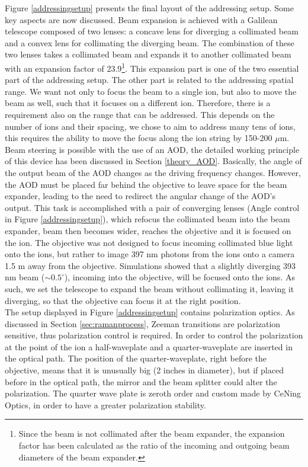 Figure \ref{addressingsetup} presents the final layout of the addressing setup. Some key aspects are now discussed. Beam expansion is achieved with a Galilean telescope composed of two lenses: a concave lens for diverging a collimated beam and a convex lens for collimating the diverging beam. The combination of these two lenses takes a collimated beam and expands it to another collimated beam with an expansion factor of 23.9\footnote{Since the beam is not collimated after the beam expander, the expansion factor has been calculated as the ratio of the incoming and outgoing beam diameters of the beam expander.}. This expansion part is one of the two essential part of the addressing setup. The other part is related to the addressing spatial range. We want not only to focus the beam to a single ion, but also to move the beam as well, such that it focuses on a different ion. Therefore, there is a requirement also on the range that can be addressed. This depends on the number of ions and their spacing, we chose to aim to address many tens of ions, this requires the ability to move the focus along the ion string by 150-200 $\mu$m. Beam steering is possible with the use of an AOD, the detailed working principle of this device has been discussed in Section \ref{theory_AOD}. Basically, the angle of the output beam of the AOD changes as the driving frequency changes. However, the AOD must be placed far behind the objective to leave space for the beam expander, leading to the need to redirect the angular change of the AOD's output. This task is accomplished with a pair of converging lenses (Angle control in Figure \ref{addressingsetup}), which refocus the collimated beam into the beam expander, beam then becomes wider, reaches the objective and it is focused on the ion. The objective was not designed to focus incoming collimated blue light onto the ions, but rather to image 397 nm photons from the ions onto a camera 1.5 m away from the objective. Simulations showed that a slightly diverging 393 nm beam ($\sim 0.5^\circ$), incoming into the objective, will be focused onto the ions. As such, we set the telescope to expand the beam without collimating it, leaving it diverging, so that the objective can focus it at the right position.\\
The setup displayed in Figure \ref{addressingsetup} contains polarization optics. As discussed in Section \ref{sec:ramanprocess}, Zeeman transitions are polarization sensitive, thus polarization control is required. In order to control the polarization at the point of the ion a half-waveplate and a quarter-waveplate are inserted in the optical path. The position of the quarter-waveplate, right before the objective, means that it is unusually big (2 inches in diameter), but if placed before in the optical path, the mirror and the beam splitter could alter the polarization. The quarter wave plate is zeroth order and custom made by CeNing Optics, in order to have a greater polarization stability.\\
